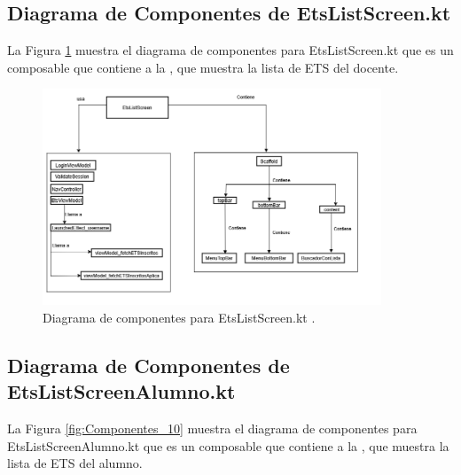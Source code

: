 \newpage

\subsection{Diagrama de Componentes de EtsListScreen.kt}

La Figura \ref{fig:Componentes_9} muestra el diagrama de componentes para EtsListScreen.kt que es un composable que contiene a la , que muestra la lista de ETS del docente.

\begin{figure}[htbp!]
	\begin{center}
		\includegraphics[width=0.9\textwidth]{DiagramasMoviles/DCM (22)}
		\caption{Diagrama de componentes para EtsListScreen.kt .}
		\label{fig:Componentes_9}
	\end{center}
\end{figure}

\newpage

\subsection{Diagrama de Componentes de EtsListScreenAlumno.kt}

La Figura \ref{fig:Componentes_10} muestra el diagrama de componentes para EtsListScreenAlumno.kt que es un composable que contiene a la , que muestra la lista de ETS del alumno.

